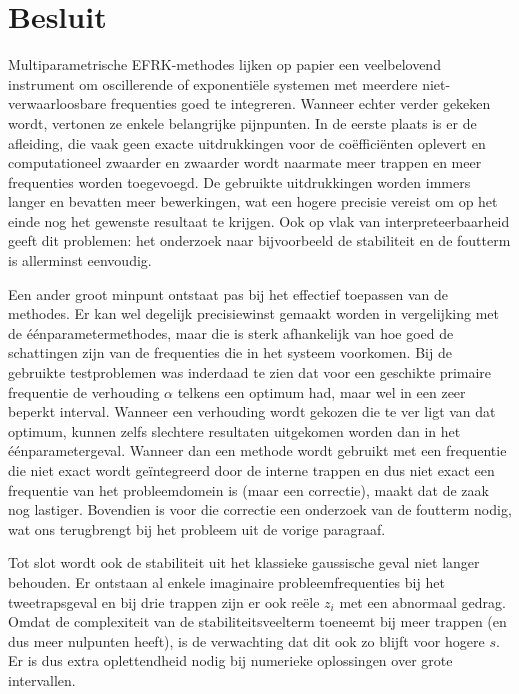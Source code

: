 \documentclass[12pt]{article}
\begin{document}
\newpage
\section{Besluit} \label{sec:conclusion}
Multiparametrische EFRK-methodes lijken op papier een veelbelovend instrument om oscillerende of exponentiële systemen met meerdere niet-verwaarloosbare frequenties goed te integreren. Wanneer echter verder gekeken wordt, vertonen ze enkele belangrijke pijnpunten. In de eerste plaats is er de afleiding, die vaak geen exacte uitdrukkingen voor de coëfficiënten oplevert en computationeel zwaarder en zwaarder wordt naarmate meer trappen en meer frequenties worden toegevoegd. De gebruikte uitdrukkingen worden immers langer en bevatten meer bewerkingen, wat een hogere precisie vereist om op het einde nog het gewenste resultaat te krijgen. Ook op vlak van interpreteerbaarheid geeft dit problemen: het onderzoek naar bijvoorbeeld de stabiliteit en de foutterm is allerminst eenvoudig.

Een ander groot minpunt ontstaat pas bij het effectief toepassen van de methodes. Er kan wel degelijk precisiewinst gemaakt worden in vergelijking met de éénparametermethodes, maar die is sterk afhankelijk van hoe goed de schattingen zijn van de frequenties die in het systeem voorkomen. Bij de gebruikte testproblemen was inderdaad te zien dat voor een geschikte primaire frequentie de verhouding \(\alpha\) telkens een optimum had, maar wel in een zeer beperkt interval. Wanneer een verhouding wordt gekozen die te ver ligt van dat optimum, kunnen zelfs slechtere resultaten uitgekomen worden dan in het éénparametergeval. Wanneer dan een methode wordt gebruikt met een frequentie die niet exact wordt geïntegreerd door de interne trappen en dus niet exact een frequentie van het probleemdomein is (maar een correctie), maakt dat de zaak nog lastiger. Bovendien is voor die correctie een onderzoek van de foutterm nodig, wat ons terugbrengt bij het probleem uit de vorige paragraaf.

Tot slot wordt ook de stabiliteit uit het klassieke gaussische geval niet langer behouden. Er ontstaan al enkele imaginaire probleemfrequenties bij het tweetrapsgeval en bij drie trappen zijn er ook reële \(z_i\) met een abnormaal gedrag. Omdat de complexiteit van de stabiliteitsveelterm toeneemt bij meer trappen (en dus meer nulpunten heeft), is de verwachting dat dit ook zo blijft voor hogere \(s\). Er is dus extra oplettendheid nodig bij numerieke oplossingen over grote intervallen.

\newpage
\appendix
{}
\renewcommand{\thesubsection}{\Alph{subsection}}
\end{document}
